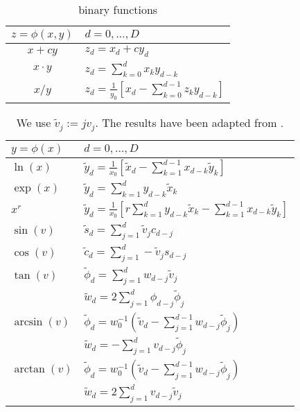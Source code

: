 \documentclass[a4paper,12pt,twoside]{article}
\begin{document}
\begin{table}[!h]
\centering
\begin{tabular}{| c | l |}
\hline
$z= \phi(x,y)$  & $d = 0,\dots,D$\\
\hline
$x + cy$ & $z_d = x_d + c y_d$ \\
$x \cdot y $ & $z_d = \sum_{k=0}^d x_k  y_{d-k}$ \\
$x / y $ & $z_d = \frac{1}{y_0} \left[ x_d - \sum_{k=0}^{d-1} z_k y_{d-k} \right]$\\
\hline
\end{tabular}

\caption{\label{tab:taylor_arithmetic_binary}
binary functions
}
\end{table}
\begin{table}[!h]
\centering
\begin{tabular}{| l | l |}
\hline 
$y = \phi(x)$  & $d = 0,\dots,D$\\
\hline \hline
$\ln(x)$ & $ \tilde y_d = \frac{1}{x_0} \left[ \tilde x_d - \sum_{k=1}^{d-1} x_{d-k} \tilde y_k \right]$ \\
\hline
$\exp(x) $ & $ \tilde y_d = \sum_{k=1}^d y_{d-k} \tilde x_k$ \\
\hline
$ x^r$ & $ \tilde y_d = \frac{1}{x_0} \left[ r \sum_{k=1}^d y_{d-k} \tilde x_k - \sum_{k=1}^{d-1} x_{d-k} \tilde y_k \right]$\\
\hline
$\sin(v)$ & $ \tilde s_d = \sum_{j=1}^d \tilde v_j c_{d-j}$ \\
$\cos(v)$ & $ \tilde c_d = \sum_{j=1}^d - \tilde  v_j s_{d-j} $\\
\hline
$\tan(v)$ & $\tilde  \phi_d = \sum_{j=1}^d w_{d-j} \tilde v_j $ \\
& $\tilde w_d = 2 \sum_{j=1}^d \phi_{d-j} \tilde \phi_j$ \\
\hline
$\arcsin(v)$ & $ \tilde \phi_d = w_0^{-1} \left( \tilde v_d - \sum_{j=1}^{d-1} w_{d-j} \tilde \phi_j \right)$\\
& $ \tilde w_d = - \sum_{j=1}^d v_{d-j} \tilde \phi_j $ \\
\hline
$\arctan(v)$ & $ \tilde \phi_d = w_0^{-1} \left( \tilde v_d - \sum_{j=1}^{d-1} w_{d-j} \tilde \phi_j \right)$\\
& $ \tilde w_d = 2 \sum_{j=1}^d v_{d-j} \tilde v_j $ \\
\hline
\end{tabular}
\caption{\label{tab:taylor_arithmetic_univariate}
We use $\tilde v_j := j v_j$. The results have been adapted from \cite{Griewank2008EDP,Neidinger2005DfC}.
}
\end{table}
 


% 





\end{document}
